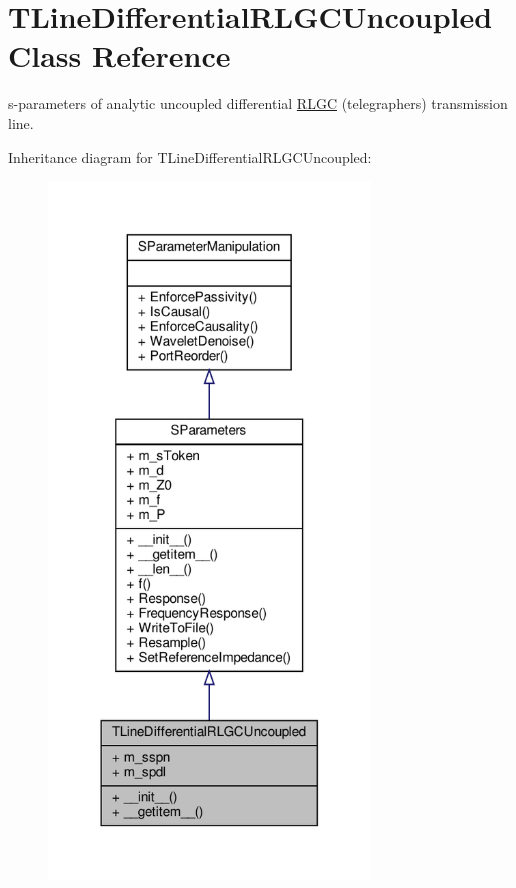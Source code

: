 \hypertarget{classSignalIntegrity_1_1SParameters_1_1Devices_1_1TLineDifferentialRLGCUncoupled_1_1TLineDifferentialRLGCUncoupled}{}\section{T\+Line\+Differential\+R\+L\+G\+C\+Uncoupled Class Reference}
\label{classSignalIntegrity_1_1SParameters_1_1Devices_1_1TLineDifferentialRLGCUncoupled_1_1TLineDifferentialRLGCUncoupled}


s-\/parameters of analytic uncoupled differential \hyperlink{namespaceSignalIntegrity_1_1SParameters_1_1RLGC}{R\+L\+GC} (telegrapher\textquotesingle{}s) transmission line.  




Inheritance diagram for T\+Line\+Differential\+R\+L\+G\+C\+Uncoupled\+:\nopagebreak
\begin{figure}[H]
\begin{center}
\leavevmode
\includegraphics[width=242pt]{classSignalIntegrity_1_1SParameters_1_1Devices_1_1TLineDifferentialRLGCUncoupled_1_1TLineDifferef680045c0ad202895eb5567e581563dd}
\end{center}
\end{figure}


